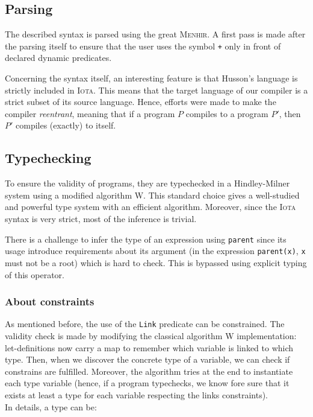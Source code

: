 \documentclass[10pt,a4paper]{article}
\newcommand\Iota{\textsc{Iota}}
\newcommand\Menhir{\textsc{Menhir}}
\newcommand{\ocaml}{\texttt}
\begin{document}
\subsection{Parsing}
The described syntax is parsed using the great \Menhir{}\cite{menhir}. A first pass is made after the parsing itself to ensure that the user uses the symbol \ocaml{+} only in front of declared dynamic predicates.

Concerning the syntax itself, an interesting feature is that Husson's language is strictly included in \Iota{}. This means that the target language of our compiler is a strict subset of its source language. Hence, efforts were made to make the compiler \emph{reentrant}, meaning that if a program $P$ compiles to a program $P'$, then $P'$ compiles (exactly) to itself.

\subsection{Typechecking}
To ensure the validity of programs, they are typechecked in a Hindley-Milner system\cite{hindley} using a modified algorithm W\cite{milner}.
This standard choice gives a well-studied and powerful type system with an efficient algorithm. Moreover, since the \Iota{} syntax is very strict, most of the inference is trivial.

There is a challenge to infer the type of an expression using \ocaml{parent} since its usage introduce requirements about its argument (in the expression \ocaml{parent(x)}, \ocaml{x} must not be a root) which is hard to check. This is bypassed using explicit typing of this operator.

\subsubsection{About constraints}
As mentioned before, the use of the \ocaml{Link} predicate can be constrained. The validity check is made by modifying the classical algorithm W implementation: let-definitions now carry a map to remember which variable is linked to which type. Then, when we discover the concrete type of a variable, we can check if constrains are fulfilled. Moreover, the algorithm tries at the end to instantiate each type variable (hence, if a program typechecks, we know fore sure that it exists at least a type for each variable respecting the links constraints).\\

In details, a type can be:
\end{document}

